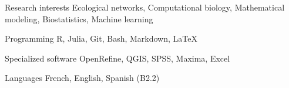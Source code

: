 

\begin{cvskills}

  \cvskill
    {Research interests} %
    {Ecological networks, Computational biology, Mathematical modeling, Biostatistics, Machine learning} %
    
  \cvskill
    {Programming} %
    {R, Julia, Git, Bash, Markdown, LaTeX} %

  \cvskill
    {Specialized software} %
    {OpenRefine, QGIS, SPSS, Maxima, Excel} %
    
  \cvskill
    {Languages} %
    {French, English, Spanish (B2.2)} %

\end{cvskills}

